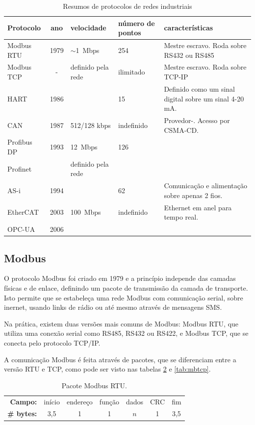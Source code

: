 \begin{table}[h]
    \caption{Resumos de protocolos de redes industriais}\label{tab:protocolos}
    \begin{tabular}{l|cp{20mm}p{20mm}p{35mm}}
        \hline
        Protocolo & ano & velocidade & número de pontos & características\\
        \hline
        Modbus RTU & 1979 & $\sim$1~Mbps & 254 & Mestre escravo. Roda sobre RS432 ou RS485\\
        Modbus TCP & - & definido pela rede & ilimitado & Mestre escravo. Roda sobre TCP-IP\\
        HART & 1986 & & 15 & Definido como um sinal digital sobre um sinal 4-20 mA.\\
        CAN & 1987 & 512/128 kbps & indefinido & Provedor-. Acesso por CSMA-CD.\\
        Profibus DP & 1993 & 12~Mbps & 126 & \\
        Profinet &  & definido pela rede &  & \\
        AS-i & 1994 & & 62 & Comunicação e alimentação sobre apenas 2 fios.\\
        EtherCAT & 2003 & 100~Mbps & indefinido & Ethernet em anel para tempo real.\\
        OPC-UA & 2006 & & & \\
        \hline
    \end{tabular}
\end{table}

\subsection{Modbus}

O protocolo Modbus foi criado em 1979 e a princípio independe das camadas físicas e de enlace, definindo um pacote de transmissão da camada de transporte. Isto permite que se estabeleça uma rede Modbus com comunicação serial, sobre inernet, usando links de rádio ou até mesmo através de mensagens SMS.

Na prática, existem duas versões mais comuns de Modbus: Modbus RTU, que utiliza uma conexão serial como RS485, RS432 ou RS422, e Modbus TCP, que se conecta pelo protocolo TCP/IP.

A comunicação Modbus é feita através de pacotes, que se diferenciam entre a versão RTU e TCP, como pode ser visto nas tabelas \ref{tab:mbrtu} e \ref{tab:mbtcp}.

\begin{table}
    \centering
    \caption{Pacote Modbus RTU.}\label{tab:mbrtu}
    \begin{tabular}{r|c|c|c|c|c|c|}
        \cline{2-7}
        \textbf{Campo:} & início & endereço & função & dados & CRC & fim\\
        \cline{2-7}
        \textbf{\# bytes:} & 3,5 & 1 & 1 & $n$ & 1 & 3,5 \\
        \cline{2-7}
    \end{tabular}
\end{table}

